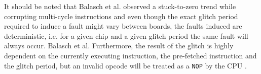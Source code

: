 It should be noted that Balasch et al. \citep{glitches_paper} observed a stuck-to-zero trend while corrupting multi-cycle instructions and even though the exact glitch period required to induce a fault might vary between boards, the faults induced are deterministic, i.e. for a given chip and a given glitch period the same fault will always occur. Balasch et al. Furthermore, the result of the glitch is highly dependent on the currently executing instruction, the pre-fetched instruction and the glitch period, but an invalid opcode will be treated as a \texttt{NOP} by the CPU \citep{glitches_paper}.
